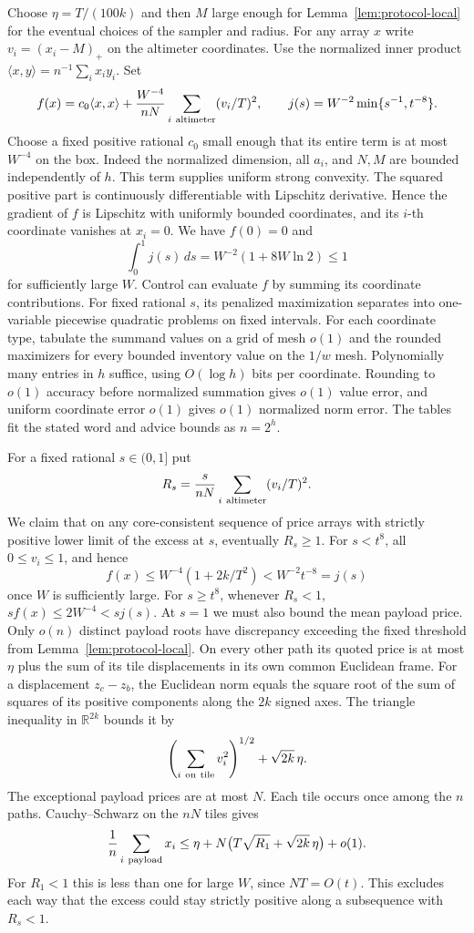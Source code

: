 Choose \(\eta=T/(100k)\) and then \(M\) large enough for
Lemma~\ref{lem:protocol-local} for the eventual choices of the sampler
and radius. For any array \(x\) write \(v_i=(x_i-M)_+\) on the altimeter
coordinates. Use the normalized inner product
\(\langle x,y\rangle=n^{-1}\sum_i x_i y_i\). Set
\begin{equation}\label{eq:protocol-score}
 f(x)=c_0\langle x,x\rangle+
       \frac{W^{-4}}{nN}\sum_{i\ {\rm altimeter}}(v_i/T)^2,
 \qquad
 j(s)=W^{-2}\min\{s^{-1},t^{-8}\}.
\end{equation}
Choose a fixed positive rational \(c_0\) small enough that its entire term
is at most \(W^{-4}\) on the box. Indeed the normalized dimension, all
\(a_i\), and \(N,M\) are bounded independently of \(h\). This term supplies
uniform strong convexity. The squared positive part is continuously
differentiable with Lipschitz derivative. Hence the gradient of \(f\) is
Lipschitz with uniformly bounded coordinates, and its \(i\)-th coordinate
vanishes at \(x_i=0\). We have \(f(0)=0\) and
\[
      \int_0^1j(s)\,ds=W^{-2}(1+8W\ln2)\le1
\]
for sufficiently large \(W\). Control can evaluate \(f\) by summing its
coordinate contributions. For fixed rational \(s\), its penalized
maximization separates into one-variable piecewise quadratic problems
on fixed intervals. For each coordinate type, tabulate the summand values
on a grid of mesh \(o(1)\) and the rounded maximizers for every bounded
inventory value on the \(1/w\) mesh. Polynomially many entries in \(h\)
suffice, using \(O(\log h)\) bits per coordinate. Rounding to \(o(1)\)
accuracy before normalized summation gives \(o(1)\) value error, and
uniform coordinate error \(o(1)\) gives \(o(1)\) normalized norm error.
The tables fit the stated word and advice bounds as \(n=2^h\).

For a fixed rational \(s\in(0,1]\) put
\[
                  R_s=\frac{s}{nN}\sum_{i\ {\rm altimeter}}(v_i/T)^2 .
\]
We claim that on any core-consistent sequence of price arrays with
strictly positive lower limit of the excess at \(s\), eventually \(R_s\ge1\).
For \(s<t^8\), all \(0\le v_i\le1\), and hence
\[
   f(x)\le W^{-4}(1+2k/T^2)< W^{-2}t^{-8}=j(s)
\]
once \(W\) is sufficiently large. For \(s\ge t^8\), whenever \(R_s<1\),
\(s f(x)\le 2W^{-4}<s j(s)\). At \(s=1\) we must also bound the mean payload
price. Only \(o(n)\) distinct payload roots have discrepancy exceeding the
fixed threshold from Lemma~\ref{lem:protocol-local}. On every other path
its quoted price is at most \(\eta\) plus the sum of its tile displacements
in its own common Euclidean frame. For a displacement \(z_c-z_b\), the
Euclidean norm equals the square root of the sum of squares of its positive
components along the \(2k\) signed axes. The triangle inequality in
\(\mathbb R^{2k}\) bounds it by
\[
           \left(\sum_{i\ {\rm on\ tile}} v_i^2\right)^{1/2}
                         +\sqrt{2k}\,\eta .
\]
The exceptional payload prices are at most \(N\). Each tile occurs once
among the \(n\) paths. Cauchy--Schwarz on the \(nN\) tiles gives
\[
 \frac1n\sum_{i\ {\rm payload}}x_i
  \le \eta+N\bigl(T\sqrt{R_1}+\sqrt{2k}\,\eta\bigr)+o(1).
\]
For \(R_1<1\) this is less than one for large \(W\), since \(NT=O(t)\).
This excludes each way that the excess could stay strictly positive along
a subsequence with \(R_s<1\).

